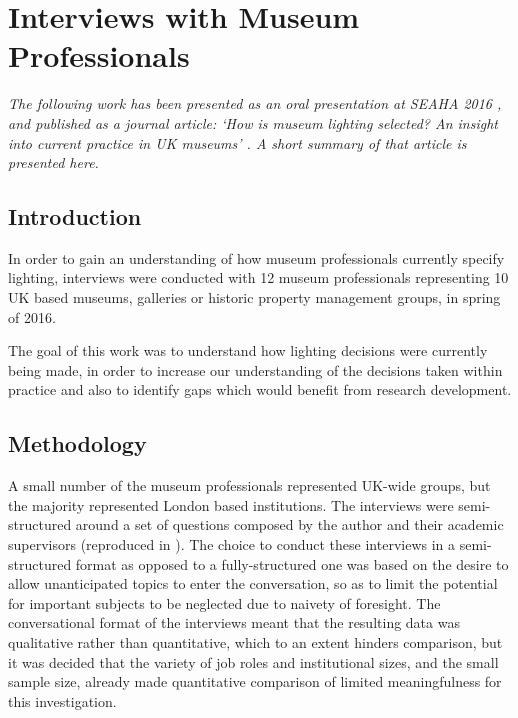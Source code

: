 \chapter{Interviews with Museum Professionals}
\label{chap:Interviews}

\textit{The following work has been presented as an oral presentation at SEAHA 2016 \citep{garside_interviewing_2016}, and published as a journal article: `How is museum lighting selected? An insight into current practice in UK museums' \citep{garside_how_2017}. A short summary of that article is presented here.}

\medskip


\section{Introduction}
In order to gain an understanding of how museum professionals currently specify lighting, interviews were conducted with 12 museum professionals representing 10 UK based museums, galleries or historic property management groups, in spring of 2016. 

The goal of this work was to understand how lighting decisions were currently being made, in order to increase our understanding of the decisions taken within practice and also to identify gaps which would benefit from research development.

\section{Methodology}
A small number of the museum professionals represented UK-wide groups, but the majority represented London based institutions. The interviews were semi-structured around a set of questions composed by the author and their academic supervisors (reproduced in \citet{garside_how_2017}). The choice to conduct these interviews in a semi-structured format as opposed to a fully-structured one was based on the desire to allow unanticipated topics to enter the conversation, so as to limit the potential for important subjects to be neglected due to naivety of foresight. The conversational format of the interviews meant that the resulting data was qualitative rather than quantitative, which to an extent hinders comparison, but it was decided that the variety of job roles and institutional sizes, and the small sample size, already made quantitative comparison of limited meaningfulness for this investigation.


